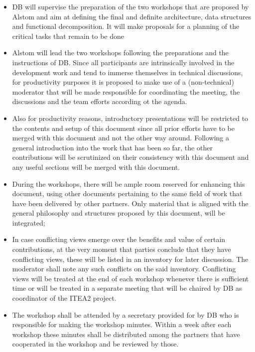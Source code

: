 \begin{itemize}
\item DB will supervise the preparation of the two workshops that are proposed by Alstom and aim at defining the final and definite architecture, data structures and functional decomposition. It will make proposals for a planning of the critical tasks that remain to be done
\item Alstom will lead the two workshops following the preparations and the instructions of DB. Since all participants are intrinsically involved in the development work and tend to immerse themselves in technical discussions, for productivity purposes it is proposed to make use of a (non-technical) moderator that will be made responsible for coordinating the meeting, the discussions and the team efforts according ot the agenda.\\
\item Also for productivity reasons, introductory presentations will be restricted to the contents and setup of this document since all prior efforts have to be merged with this document and not the other way around. Following a general introduction into the work that has been so far, the other contributions will be scrutinized on their consistency with this document and any useful sections will be merged with this document.\\
\item During the workshops, there will be ample room reserved for enhancing this document, using other documents pertaining to the same field of work that have been delivered by other partners. Only material that is aligned with the general philosophy and structures proposed by this document, will be integrated;\\
\item In case conflicting views emerge over the benefits and value of certain contributions, at the very moment that parties conclude that they have conflicting views, these will be listed in an inventory for later discussion. The moderator shall note any such conflicts on the said inventory. Conflicting views will be treated at the end of each workshop whenever there is sufficient time or will be treated in a separate meeting that will be chaired by DB as coordinator of the ITEA2 project.\\
\item The workshop shall be attended by a secretary provided for by DB who is responsible for making the workshop minutes. Within a week after each workshop these minutes shall be distributed among the partners that have cooperated in the workshop and be reviewed by those. \\

\end{itemize}
